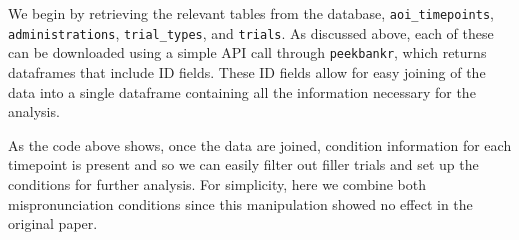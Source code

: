 \documentclass[
  english,
  man,floatsintext]{apa6}
\newenvironment{Shaded}{\begin{snugshade}}{\end{snugshade}}
\newcommand{\DataTypeTok}[1]{\textcolor[rgb]{0.13,0.29,0.53}{#1}}
\newcommand{\FloatTok}[1]{\textcolor[rgb]{0.00,0.00,0.81}{#1}}
\newcommand{\KeywordTok}[1]{\textcolor[rgb]{0.13,0.29,0.53}{\textbf{#1}}}
\newcommand{\NormalTok}[1]{#1}
\newcommand{\OperatorTok}[1]{\textcolor[rgb]{0.81,0.36,0.00}{\textbf{#1}}}
\newcommand{\StringTok}[1]{\textcolor[rgb]{0.31,0.60,0.02}{#1}}
\begin{document}
We begin by retrieving the relevant tables from the database, \texttt{aoi\_timepoints}, \texttt{administrations}, \texttt{trial\_types}, and \texttt{trials}. As discussed above, each of these can be downloaded using a simple API call through \texttt{peekbankr}, which returns dataframes that include ID fields. These ID fields allow for easy joining of the data into a single dataframe containing all the information necessary for the analysis.

\begin{Shaded}
\end{Shaded}

As the code above shows, once the data are joined, condition information for each timepoint is present and so we can easily filter out filler trials and set up the conditions for further analysis. For simplicity, here we combine both mispronunciation conditions since this manipulation showed no effect in the original paper.

\begin{Shaded}
\end{Shaded}
\end{document}
